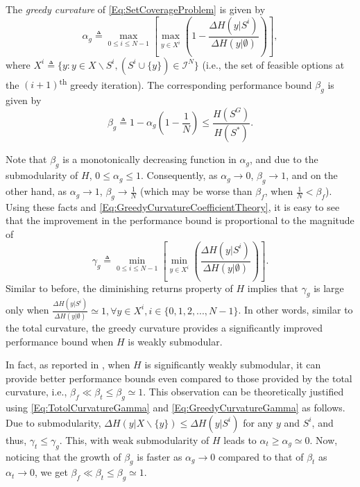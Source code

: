 \documentclass[letterpaper, 10 pt, conference]{ieeeconf}
\newcommand{\tsup}[1]{\textsuperscript{#1}}
\begin{document}
The \emph{greedy curvature} of \eqref{Eq:SetCoverageProblem} is given by   
\begin{equation}\label{Eq:GreedyCurvatureCoefficientTheory}
    \alpha_g \triangleq \max_{0 \leq i \leq N-1} \left[ \max_{y \in X^i}\left(1 - \frac{\Delta H(y\vert S^i)}{\Delta H(y\vert \emptyset)}\right) \right],
\end{equation}
where $X^i \triangleq \{y: y \in X \backslash S^i, (S^i \cup \{y\}) \in \mathcal{I}^N\}$ (i.e., the set of feasible options at the $(i+1)$\tsup{th} greedy iteration). The corresponding performance bound $\beta_g$ is given by  
\begin{equation}\label{Eq:GreedyCurvatureBoundTheory}
    \beta_g \triangleq 1-\alpha_g\left(1-\frac{1}{N}\right) \leq \frac{H(S^G)}{H(S^*)}. 
\end{equation}

Note that $\beta_g$ is a monotonically decreasing function in $\alpha_g$, and due to the submodularity of $H$, $0 \leq \alpha_g \leq 1$. Consequently, as $\alpha_g \rightarrow 0$, $\beta_g \rightarrow 1$, and on the other hand, as $\alpha_g \rightarrow 1$, $\beta_g \rightarrow \frac{1}{N}$ (which may be worse than $\beta_f$, when $\frac{1}{N} < \beta_f$). Using these facts and \eqref{Eq:GreedyCurvatureCoefficientTheory}, it is easy to see that the improvement in the performance bound is proportional to the magnitude of 
\begin{equation}\label{Eq:GreedyCurvatureGamma}
    \gamma_g \triangleq \min_{0 \leq i \leq N-1} \left[ \min_{y \in X^i}\left(\frac{\Delta H(y\vert S^i)}{\Delta H(y\vert \emptyset)}\right) \right].
\end{equation}
Similar to before, the diminishing returns property of $H$ implies that $\gamma_g$ is large only when 
$\frac{\Delta H(y\vert S^i)}{\Delta H(y\vert \emptyset)} \simeq 1, \forall y\in X^i, i\in \{0,1,2,...,N-1\}$. In other words, similar to the total curvature, the greedy curvature provides a significantly improved performance bound when $H$ is weakly submodular. 


In fact, as reported in \cite{Sun2020}, when $H$ is significantly weakly submodular, it can provide better performance bounds even compared to those provided by the total curvature, i.e., $\beta_f \ll \beta_t \leq \beta_g \simeq 1$. This observation can be theoretically justified using \eqref{Eq:TotolCurvatureGamma} and \eqref{Eq:GreedyCurvatureGamma} as follows. Due to submodularity, $\Delta H(y \vert X \backslash \{y\}) \leq \Delta H(y\vert S^i)$ for any $y$ and $S^i$, and thus, $\gamma_t \leq \gamma_g$. This, with weak submodularity of $H$ leads to $\alpha_t \geq \alpha_g \simeq 0$. Now, noticing that the growth of $\beta_g$ is faster as $\alpha_g \rightarrow 0$ compared to that of $\beta_t$ as $\alpha_t \rightarrow 0$, we get $\beta_f \ll \beta_t \leq \beta_g \simeq 1$.
\end{document}
